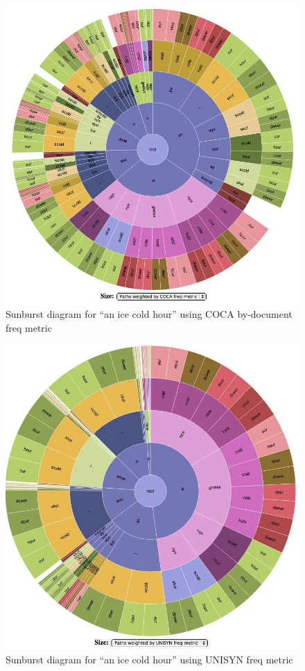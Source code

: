 \begin{figure}
\includegraphics[width=\textwidth]{aNiceColdHour_COCA_FreqMetric.jpg}
\captionfonts
\caption[Sunburst diagram for ``an ice cold hour'' using COCA by-document freq metric]{Sunburst diagram for ``an ice cold hour'' using COCA by-document freq metric }
\label{fig:futureWork:COCAsunburst}
\end{figure}

\begin{figure}
\includegraphics[width=\textwidth]{aNiceColdHour_UNISYN_FreqMetric.jpg}
\captionfonts
\caption[Sunburst diagram for ``an ice cold hour'' using UNISYN freq metric]{Sunburst diagram for ``an ice cold hour'' using UNISYN freq metric }
\label{fig:futureWork:UNISYNsunburst}
\end{figure}

